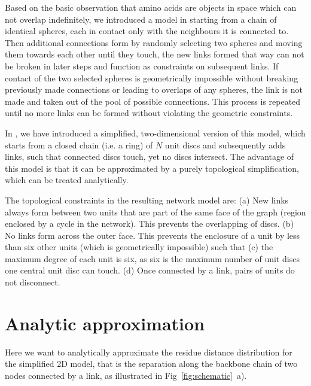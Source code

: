\documentclass[
reprint,
twocolumn,
amsmath,amssymb,superscriptaddress,aps,
pre]{revtex4-1}
\begin{document}
Based on the basic observation that amino acids are objects in space which can not overlap indefinitely, we introduced a model in \cite{molkenthin2020self} starting from a chain of identical spheres, each in contact only with the neighbours it is connected to. Then additional connections form by randomly selecting two spheres and moving them towards each other until they touch, the new links formed that way can not be broken in later steps and function as constraints on subsequent links. If contact of the two selected spheres is geometrically impossible without breaking previously made connections or leading to overlaps of any spheres, the link is not made and taken out of the pool of possible connections. This process is repeated until no more links can be formed without violating the geometric constraints.

In \cite{molkenthin2016scaling}, we have introduced a simplified, two-dimensional version of this model, which starts from a closed chain (i.e. a ring) of $N$ unit discs and subsequently adds links, such that connected discs touch, yet no discs intersect. The advantage of this model is that it can be approximated by a purely topological simplification, which can be treated analytically.

The topological constraints in the resulting network model are:
(a) New links always form between two units that are part of the same face of the graph (region enclosed by a cycle in the network). This prevents the overlapping of discs. (b) No links form across the outer face. This prevents the enclosure of a unit by less than six other units (which is geometrically impossible) such that (c) the maximum degree of each unit is six, as six is the maximum number of unit discs one central unit disc can touch. (d) Once connected by a link, pairs of units do not disconnect.

\section*{Analytic approximation}
Here we want to analytically approximate the residue distance distribution for the simplified 2D model, that is the separation along the backbone chain of two nodes connected by a link, as illustrated in Fig~\ref{fig:schematic}~a).
\end{document}
